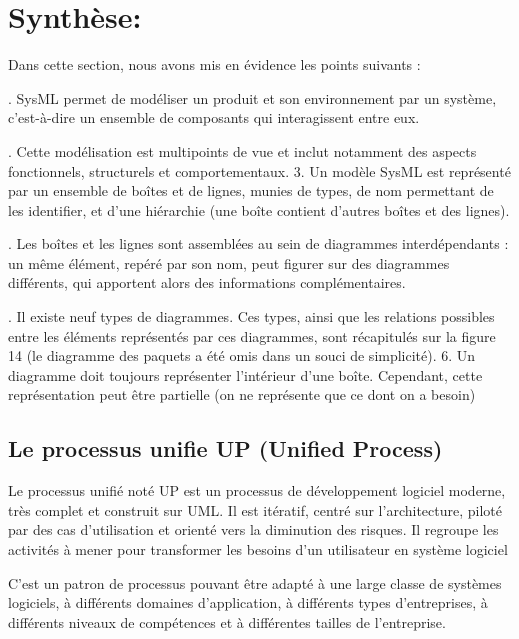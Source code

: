 \documentclass[12pt,a4paper]{report}
\begin{document}
\noindent \begin{flushleft}
	
\end{flushleft}


\section{ Synthèse: }

\noindent \begin{flushleft}
	
	
	\noindent Dans cette section, nous avons mis en \'{e}vidence les points suivants :
	
	. SysML permet de mod\'{e}liser un produit et son environnement par un syst\`{e}me, c'est-\`{a}-dire un ensemble de composants qui interagissent entre eux. 
	
	. Cette mod\'{e}lisation est multipoints de vue et inclut notamment des aspects fonctionnels, structurels et comportementaux. 3. Un mod\`{e}le SysML est repr\'{e}sent\'{e} par un ensemble de bo\^{i}tes et de lignes, munies de types, de nom permettant de les identifier, et d'une hi\'{e}rarchie (une bo\^{i}te contient d'autres bo\^{i}tes et des lignes).
	
	. Les bo\^{i}tes et les lignes sont assembl\'{e}es au sein de diagrammes interd\'{e}pendants : un m\^{e}me \'{e}l\'{e}ment, rep\'{e}r\'{e} par son nom, peut figurer sur des diagrammes diff\'{e}rents, qui apportent alors des informations compl\'{e}mentaires.
	
	. Il existe neuf types de diagrammes. Ces types, ainsi que les relations possibles entre les \'{e}l\'{e}ments repr\'{e}sent\'{e}s par ces diagrammes, sont r\'{e}capitul\'{e}s sur la figure 14 (le diagramme des paquets a \'{e}t\'{e} omis dans un souci de simplicit\'{e}). 6. Un diagramme doit toujours repr\'{e}senter l'int\'{e}rieur d'une bo\^{i}te. Cependant, cette repr\'{e}sentation peut \^{e}tre partielle (on ne repr\'{e}sente que ce dont on a besoin)
	
	\noindent 
\end{flushleft}


\subsection{Le processus unifie UP (Unified Process)}

\noindent \begin{flushleft}
	Le processus unifi\'{e} not\'{e} UP est un processus de d\'{e}veloppement logiciel moderne, tr\`{e}s complet et construit sur UML. Il est it\'{e}ratif, centr\'{e} sur l'architecture, pilot\'{e} par des cas d'utilisation et orient\'{e} vers la diminution des risques. Il regroupe les activit\'{e}s \`{a} mener pour transformer les besoins d'un utilisateur en syst\`{e}me logiciel 
	
	\noindent C'est un patron de processus pouvant \^{e}tre adapt\'{e} \`{a} une large classe de syst\`{e}mes logiciels, \`{a} diff\'{e}rents domaines d'application, \`{a} diff\'{e}rents types d'entreprises, \`{a} diff\'{e}rents niveaux de comp\'{e}tences et \`{a} diff\'{e}rentes tailles de l'entreprise.
\end{flushleft}
\end{document}
